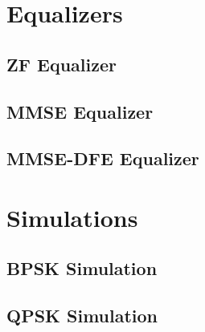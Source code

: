 \documentclass[]{article}
\begin{document}
\section{Equalizers}
\subsection{ZF Equalizer}

\subsection{MMSE Equalizer}

\subsection{MMSE-DFE Equalizer}



\section{Simulations}
\subsection{BPSK Simulation}


\subsection{QPSK Simulation}

\end{document}
